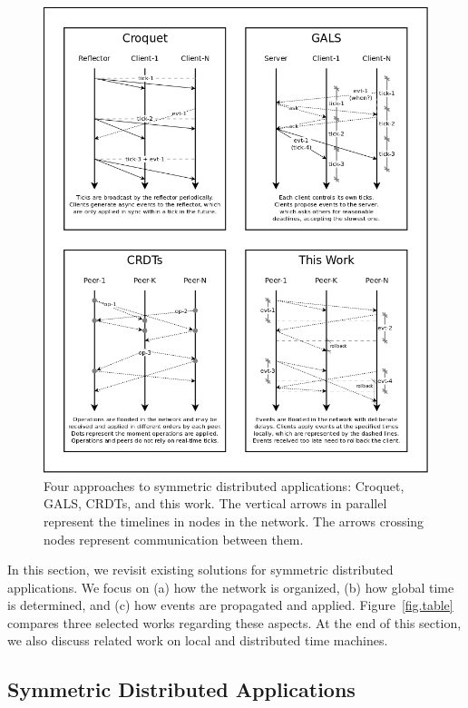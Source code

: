 \documentclass[12pt]{article}
\begin{document}
\begin{figure}
  \centering
  \includegraphics[width=\linewidth]{algos}
  \caption{
    \label{fig.algos}
    Four approaches to symmetric distributed applications: Croquet, GALS,
    CRDTs, and this work.
    The vertical arrows in parallel represent the timelines in nodes in the
    network.
    The arrows crossing nodes represent communication between them.
  }
\end{figure}

In this section, we revisit existing solutions for symmetric distributed
applications.
We focus on
    (a) how the network is organized,
    (b) how global time is determined, and
    (c) how events are propagated and applied.
Figure~\ref{fig.table} compares three selected works regarding these aspects.
%
At the end of this section, we also discuss related work on local and
distributed time machines.

\subsection{Symmetric Distributed Applications}
\end{document}
